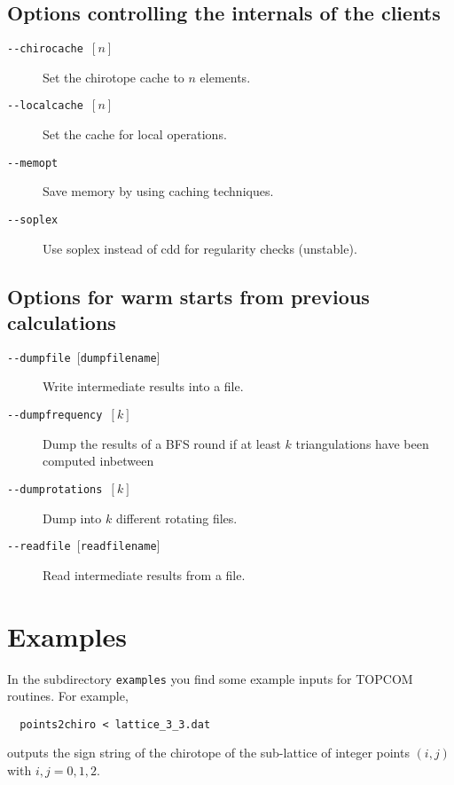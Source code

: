 \documentclass[12pt,a4paper]{article}
\begin{document}
\subsection*{Options controlling the internals of the clients}
\begin{description}
\item[\texttt{-}\texttt{-chirocache $[n]$}] Set the chirotope cache to $n$ elements.
\item[\texttt{-}\texttt{-localcache $[n]$}] Set the cache for local operations.
\item[\texttt{-}\texttt{-memopt}] Save memory by using caching techniques.
\item[\texttt{-}\texttt{-soplex}] Use soplex instead of cdd for regularity checks (unstable).
\end{description}

\subsection{Options for warm starts from previous calculations}
\label{sec:options-warm-starts}
\begin{description}
\item[\texttt{-}\texttt{-dumpfile $[$dumpfilename$]$}] Write intermediate results into a file.
\item[\texttt{-}\texttt{-dumpfrequency $[k]$}] Dump the results of a
  BFS round if at least $k$ triangulations have been computed
  inbetween
\item[\texttt{-}\texttt{-dumprotations $[k]$}] Dump into $k$ different rotating files.
\item[\texttt{-}\texttt{-readfile $[$readfilename$]$}] Read intermediate results from a file.
\end{description}




\section{Examples}
\label{sec:examples}

In the subdirectory \texttt{examples} you find some example inputs for TOPCOM
routines.  For example,

\begin{verbatim}
  points2chiro < lattice_3_3.dat
\end{verbatim}

outputs the sign string of the chirotope of the sub-lattice of integer points
$(i,j)$ with $i, j = 0, 1, 2$.
\end{document}
